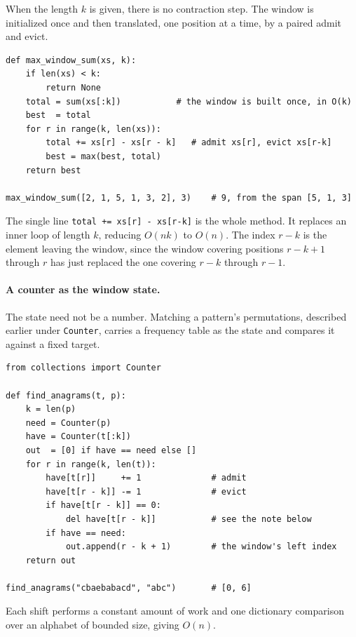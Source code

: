 When the length $k$ is given, there is no contraction step. The window is
initialized once and then translated, one position at a time, by a paired
admit and evict.

\begin{lstlisting}[style=python, caption={Maximum sum over any window of length k}]
def max_window_sum(xs, k):
    if len(xs) < k:
        return None
    total = sum(xs[:k])           # the window is built once, in O(k)
    best  = total
    for r in range(k, len(xs)):
        total += xs[r] - xs[r - k]   # admit xs[r], evict xs[r-k]
        best = max(best, total)
    return best

max_window_sum([2, 1, 5, 1, 3, 2], 3)    # 9, from the span [5, 1, 3]
\end{lstlisting}

The single line \texttt{total += xs[r] - xs[r-k]} is the whole method. It
replaces an inner loop of length $k$, reducing $O(nk)$ to $O(n)$. The index
$r-k$ is the element leaving the window, since the window covering positions
$r-k+1$ through $r$ has just replaced the one covering $r-k$ through $r-1$.

\paragraph{A counter as the window state.} The state need not be a number.
Matching a pattern's permutations, described earlier under \texttt{Counter},
carries a frequency table as the state and compares it against a fixed target.

\begin{lstlisting}[style=python, caption={Every starting index at which a permutation of p occurs in t}]
from collections import Counter

def find_anagrams(t, p):
    k = len(p)
    need = Counter(p)
    have = Counter(t[:k])
    out  = [0] if have == need else []
    for r in range(k, len(t)):
        have[t[r]]     += 1              # admit
        have[t[r - k]] -= 1              # evict
        if have[t[r - k]] == 0:
            del have[t[r - k]]           # see the note below
        if have == need:
            out.append(r - k + 1)        # the window's left index
    return out

find_anagrams("cbaebabacd", "abc")       # [0, 6]
\end{lstlisting}

Each shift performs a constant amount of work and one dictionary comparison
over an alphabet of bounded size, giving $O(n)$.

